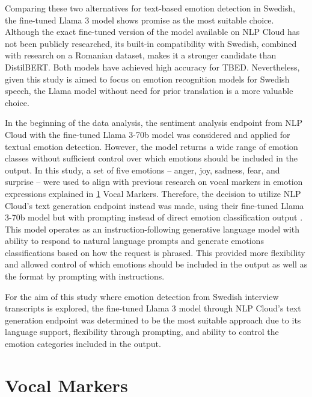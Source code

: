 Comparing these two alternatives for text-based emotion detection in Swedish, the fine-tuned Llama 3 model shows promise as the most suitable choice. Although the exact fine-tuned version of the model available on NLP Cloud has not been publicly researched, its built-in compatibility with Swedish, combined with research on a Romanian dataset, makes it a stronger candidate than DistilBERT. Both models have achieved high accuracy for TBED. Nevertheless, given this study is aimed to focus on emotion recognition models for Swedish speech, the Llama model without need for prior translation is a more valuable choice.

\medskip
In the beginning of the data analysis, the sentiment analysis endpoint from NLP Cloud with the fine-tuned Llama 3-70b model was considered and applied for textual emotion detection. However, the model returns a wide range of emotion classes without sufficient control over which emotions should be included in the output. In this study, a set of five emotions – anger, joy, sadness, fear, and surprise – were used to align with previous research on vocal markers in emotion expressions explained in \ref{sec:vocal-markers} Vocal Markers.  
Therefore, the decision to utilize NLP Cloud’s text generation endpoint instead was made, using their fine-tuned Llama 3-70b model but with prompting instead of direct emotion classification output \autocite{NLPCloudGeneration2025}. This model operates as an instruction-following generative language model with ability to respond to natural language prompts and generate emotions classifications based on how the request is phrased. This provided more flexibility and allowed control of which emotions should be included in the output as well as the format by prompting with instructions. 

For the aim of this study where emotion detection from Swedish interview transcripts is explored, the fine-tuned Llama 3 model through NLP Cloud’s text generation endpoint was determined to be the most suitable approach due to its language support, flexibility through prompting, and ability to control the emotion categories included in the output. 

 

\section{Vocal Markers}
\label{sec:vocal-markers}

